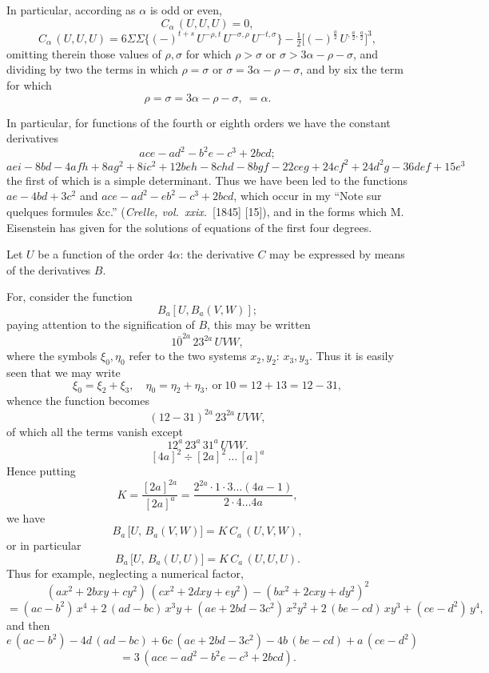 \documentclass[11pt]{article}
\begin{document}
In particular, according as $\alpha$ is odd or even,
\[
C_\alpha\,(U, U, U) = 0,
\]
\[
C_\alpha\,(U, U, U) = 6\Sigma\Sigma\bigl\{(-)^{t+s}\,U^{-\rho, t}\,U^{-\sigma, \rho}\,U^{-t, \sigma}\bigr\} - \tfrac{1}{2}\bigl[(-)^{\frac{a}{2}}\,U^{,\frac{a}{2},\frac{a}{2}}\bigr]^3,
\]
omitting therein those values of $\rho, \sigma$ for which $\rho > \sigma$ or $\sigma > 3\alpha - \rho - \sigma$, and dividing by
two the terms in which $\rho = \sigma$ or $\sigma = 3\alpha - \rho - \sigma$, and by six the term for which
\[
\rho = \sigma = 3\alpha - \rho - \sigma,\ = \alpha.
\]

In particular, for functions of the fourth or eighth orders we have the constant
derivatives
\[
ace - ad^2 - b^2 e - c^3 + 2 b c d;
\]
\[
aei - 8 b d - 4 a f h + 8 a g^2 + 8 i c^2 + 12 b e h - 8 c h d - 8 b g f - 22 c e g + 24 c f^2 + 24 d^2 g - 36 d e f + 15 e^3
\]
the first of which is a simple determinant. Thus we have been led to the functions
$ae - 4bd + 3c^2$ and $ace - ad^2 - eb^2 - c^3 + 2bcd$, which occur in my ``Note sur quelques
formules \&c.'' (\textit{Crelle, vol.~xxix.}~[1845] [15]), and in the forms which M. Eisenstein has
given for the solutions of equations of the first four degrees.

Let $U$ be a function of the order $4\alpha$: the derivative $C$ may be expressed by
means of the derivatives $B$.

For, consider the function
\[
B_a[U, B_a(V, W)];
\]
paying attention to the signification of $B$, this may be written
\[
1\overline{0}^{2a}\,23^{2a}\,U V W,
\]
where the symbols $\xi_0, \eta_0$ refer to the two systems $x_2, y_2$: $x_3, y_3$. Thus it is easily seen
that we may write
\[
\xi_0 = \xi_2 + \xi_3,\quad \eta_0 = \eta_2 + \eta_3,\ \text{or}\ 10 = 12 + 13 = 12 - 31,
\]
whence the function becomes
\[
(12 - 31)^{2a}\,23^{2a}\,U V W,
\]
of which all the terms vanish except
\[
12^a\,23^a\,31^a\,U V W.
\]
\[
\left[4 a\right]^2 \div \left[2 a\right]^2\,\ldots\,\left[a\right]^a
\]
Hence putting
\[
K = \frac{[2 a]^{2a}}{[2 a]^a} = \frac{2^{2a} \cdot 1 \cdot 3 \ldots (4 a - 1)}{2 \cdot 4 \ldots 4 a},
\]
we have
\[
B_a\,\bigl[U,\,B_a(V, W)\bigr] = K\,C_a\,(U, V, W),
\]
or in particular
\[
B_a\,\bigl[U,\,B_a(U, U)\bigr] = K\,C_a\,(U, U, U).
\]
Thus for example, neglecting a numerical factor,
\[
(a x^2 + 2 b x y + c y^2)\,(c x^2 + 2 d x y + e y^2) - (b x^2 + 2 c x y + d y^2)^2
\]
\[
= (ac - b^2)\,x^4 + 2\,(ad - bc)\,x^3 y + (ae + 2bd - 3c^2)\,x^2 y^2 + 2\,(be - cd)\,x y^3 + (ce - d^2)\,y^4,
\]
and then
\[
e\,(ac - b^2) - 4 d\,(ad - bc) + 6 c\,(ae + 2 b d - 3 c^2) - 4 b\,(be - cd) + a\,(ce - d^2)
\]
\[
= 3\,(ace - ad^2 - b^2 e - c^3 + 2 b c d).
\]
\end{document}
